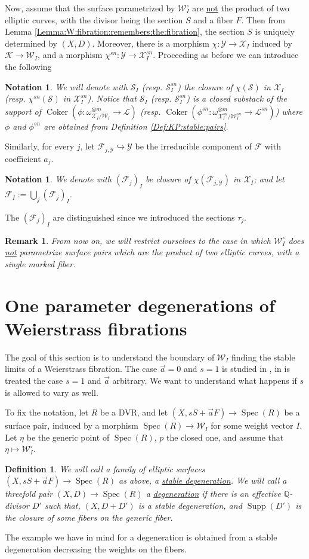 \documentclass[11pt]{amsart}
\newcommand{\cE}{\mathcal{W}}
\newcommand{\sF}{\mathscr{F}}
\newcommand{\sS}{\mathscr{S}}
\newcommand{\sX}{\mathscr{X}}
\newcommand{\cL}{\mathcal{L}}
\newcommand{\spec}{\operatorname{Spec}}
\newcommand{\Kg}{\mathcal{K}}
\newcommand{\sY}{\mathscr{Y}}
\newcommand{\supp}{\operatorname{Supp}}
\newtheorem{Def}[theorem]{Definition}
\newtheorem{Notation}[theorem]{Notation}
\newtheorem{Remark}[theorem]{Remark}
\theoremstyle{definition}
\begin{document}
Now, assume that the surface parametrized by $\cE_I^\circ$ are \underline{not}
the product of two elliptic curves, with the divisor being the section $S$ and a fiber $F$. Then from Lemma \ref{Lemma:W:fibration:remembers:the:fibration}, the section $S$ is uniquely determined by $(X,D)$. Moreover, there is a morphism $\chi:\sY \to \sX_I$ induced by $\Kg \to \cE_I$, and a morphism $\chi^{sn}:\sY \to \sX_I^{sn}$. Proceeding as before we can introduce the following
\begin{Notation}\label{Notation:def:SI} We will denote with $\sS_I$ (resp. $\sS_I^{sn}$) the closure of $\chi(\sS)$ in $\sX_I$ (resp. $\chi^{sn}(\sS)$ in $\sX_I^{sn}$). Notice that $\sS_I$ (resp. $\sS_I^{sn}$) is a closed substack of the support of $\operatorname{Coker}(\phi:\omega_{\sX_I/\cE_I}^{\otimes m} \to \cL)$ (resp. $\operatorname{Coker}(\phi^{sn}:\omega_{\sX_I^{sn}/\cE_I^{sn}}^{\otimes m} \to \cL^{sn})$) where $\phi$ and $\phi^{sn}$ are obtained from Definition \ref{Def:KP:stable:pairs}.\end{Notation}
Similarly, for every $j$, let $\sF_{j,\sY}
  \hookrightarrow \sY$ be the irreducible component of $\sF$ with coefficient $a_j$. 
  \begin{Notation}We denote with $(\sF_{j})_I$ be closure of $\chi(\sF_{j,\sY})$ in $\sX_I$; and let $\sF_I :=\bigcup_j (\sF_j)_I$.
  \end{Notation}
  The $(\sF_j)_I$ are distinguished since we introduced the sections $\tau_j$.
\begin{Remark}
From now on, we will restrict ourselves to the case in which $\cE_I^\circ$ does \underline{not} parametrize surface pairs which are the product of two elliptic curves, with a single marked fiber.
\end{Remark}

\section{One parameter degenerations of Weierstrass fibrations}\label{section:singularities:threefold}
The goal of this section is to understand the boundary of $\cE_I$
finding the stable limits of a Weierstrass fibration. The case $\vec{a}=0$ and $s=1$ is studied in \cite{LaNave}, in \cite{AB3} is treated the case $s=1$ and $\vec{a}$ arbitrary. We want to understand what happens if $s$ is allowed to vary as well.

To fix the notation,
let $R$ be a DVR, and let $(X,sS+\vec{a}F) \to \spec(R)$ be a surface pair, induced by a morphism
$\spec(R) \to \cE_I$ for some weight vector $I$. Let
$\eta$ be the generic point of $\spec(R)$, $p$ the closed one, and assume that $\eta \mapsto \cE_I^\circ$.
\begin{Def}
 We will call a family of elliptic surfaces $(X,sS+\vec{a}F) \to \spec(R)$ as above, a \underline{stable degeneration}. We will call a threefold pair $(X,D) \to \spec(R)$ a \underline{degeneration} if there is an effective $\mathbb{Q}$-divisor $D'$ such that, $(X,D+D')$ is a stable degeneration, and $\supp(D')$ is the closure of some fibers on the generic fiber.
\end{Def}
The example we have in mind for a degeneration is obtained from a stable degeneration decreasing the weights on the fibers.
\end{document}

